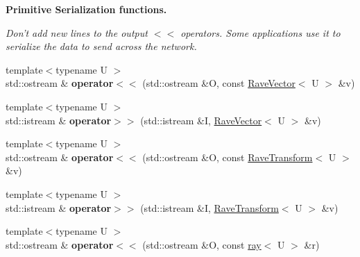 \begin{Indent}{\bf Primitive Serialization functions.}\par
{\em \label{_amgrp7d51180c86e76dfc0132e641a7316a52}
 Don't add new lines to the output $<$$<$ operators. Some applications use it to serialize the data to send across the network. }\begin{DoxyCompactItemize}
\item 
\hypertarget{namespaceOpenRAVE_1_1geometry_aae7311f073989970a1ab1d34fa8b946c}{
{\footnotesize template$<$typename U $>$ }\\std::ostream \& {\bfseries operator$<$$<$} (std::ostream \&O, const \hyperlink{classOpenRAVE_1_1geometry_1_1RaveVector}{RaveVector}$<$ U $>$ \&v)}
\label{namespaceOpenRAVE_1_1geometry_aae7311f073989970a1ab1d34fa8b946c}

\item 
\hypertarget{namespaceOpenRAVE_1_1geometry_aa2e16d81c858602abbc4a828510d6ab4}{
{\footnotesize template$<$typename U $>$ }\\std::istream \& {\bfseries operator$>$$>$} (std::istream \&I, \hyperlink{classOpenRAVE_1_1geometry_1_1RaveVector}{RaveVector}$<$ U $>$ \&v)}
\label{namespaceOpenRAVE_1_1geometry_aa2e16d81c858602abbc4a828510d6ab4}

\item 
\hypertarget{namespaceOpenRAVE_1_1geometry_ab90ce8155aaf777b0fdf95736fcc7be7}{
{\footnotesize template$<$typename U $>$ }\\std::ostream \& {\bfseries operator$<$$<$} (std::ostream \&O, const \hyperlink{classOpenRAVE_1_1geometry_1_1RaveTransform}{RaveTransform}$<$ U $>$ \&v)}
\label{namespaceOpenRAVE_1_1geometry_ab90ce8155aaf777b0fdf95736fcc7be7}

\item 
\hypertarget{namespaceOpenRAVE_1_1geometry_a0f7c3ef1ef9d18db3c693dc1cf483dcc}{
{\footnotesize template$<$typename U $>$ }\\std::istream \& {\bfseries operator$>$$>$} (std::istream \&I, \hyperlink{classOpenRAVE_1_1geometry_1_1RaveTransform}{RaveTransform}$<$ U $>$ \&v)}
\label{namespaceOpenRAVE_1_1geometry_a0f7c3ef1ef9d18db3c693dc1cf483dcc}

\item 
\hypertarget{namespaceOpenRAVE_1_1geometry_a6ff518fbec39bea10fbe04d53590d7f0}{
{\footnotesize template$<$typename U $>$ }\\std::ostream \& {\bfseries operator$<$$<$} (std::ostream \&O, const \hyperlink{classOpenRAVE_1_1geometry_1_1ray}{ray}$<$ U $>$ \&r)}
\label{namespaceOpenRAVE_1_1geometry_a6ff518fbec39bea10fbe04d53590d7f0}


\end{DoxyCompactItemize}
\end{Indent}
